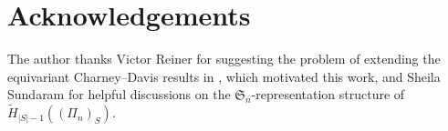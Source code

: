 \documentclass[reqno]{amsart}
\theoremstyle{definition}
\theoremstyle{remark}
\begin{document}
\section*{Acknowledgements}
The author thanks Victor Reiner for suggesting the problem of extending the equivariant Charney--Davis results in \cite{Liao2023Two}, which motivated this work, and Sheila Sundaram for helpful discussions on the $\mathfrak{S}_n$-representation structure of $\tilde{H}_{|S|-1}((\Pi_n)_S)$.






\end{document}

